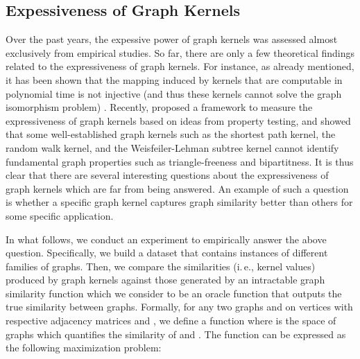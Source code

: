 \documentclass[twoside,11pt]{article}
\newcommand{\ie}{i.\,e., }
\begin{document}
\subsection{Expessiveness of Graph Kernels}
Over the past years, the expessive power of graph kernels was assessed almost exclusively from empirical studies.
So far, there are only a few theoretical findings related to the expressiveness of graph kernels.
For instance, as already mentioned, it has been shown that the mapping induced by kernels that are computable in polynomial time is not injective (and thus these kernels cannot solve the graph isomorphism problem) .
Recently,  proposed a framework to measure the expressiveness of graph kernels based on ideas from property testing, and showed that some well-established graph kernels such as the shortest path kernel, the random walk kernel, and the Weisfeiler-Lehman subtree kernel cannot identify fundamental graph properties such as triangle-freeness and bipartitness.
It is thus clear that there are several interesting questions about the expressiveness of graph kernels which are far from being answered.
An example of such a question is whether a specific graph kernel captures graph similarity better than others for some specific application.

In what follows, we conduct an experiment to empirically answer the above question.
Specifically, we build a dataset that contains instances of different families of graphs.
Then, we compare the similarities (\ie kernel values) produced by graph kernels against those generated by an intractable graph similarity function which we consider to be an oracle function that outputs the true similarity between graphs.
Formally, for any two graphs  and  on  vertices with respective  adjacency matrices  and , we define a function  where  is the space of graphs which quantifies the similarity of  and .
The function can be expressed as the following maximization problem:
\end{document}
